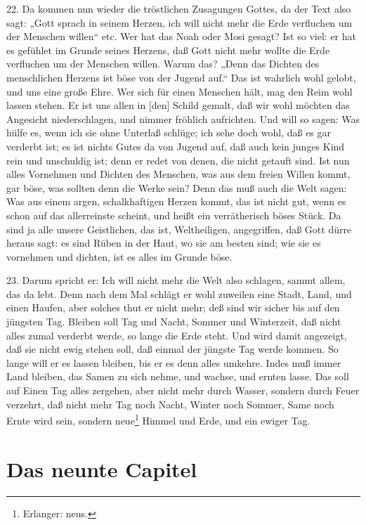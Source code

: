 22. Da kommen nun wieder die tröstlichen Zusagungen Gottes, da der Text also sagt: „Gott sprach in seinem Herzen, ich will nicht mehr die Erde verfluchen um der Menschen willen“ etc. Wer hat das Noah oder Mosi gesagt? Ist so viel: er hat es gefühlet im Grunde seines Herzens, daß Gott nicht mehr wollte die Erde verfluchen um der Menschen willen. Warum das? „Denn das Dichten des menschlichen Herzens ist böse von der Jugend auf.“ Das ist wahrlich wohl gelobt, und uns eine große Ehre. Wer sich für einen Menschen hält, mag den Reim wohl lassen stehen. Er ist uns allen in [den] Schild gemalt, daß wir wohl möchten das Angesicht niederschlagen, und nimmer fröhlich aufrichten. Und will so sagen: Was hülfe es, wenn ich sie ohne Unterlaß schlüge; ich sehe doch wohl, daß es gar verderbt ist; es ist nichts
Gutes da von Jugend auf, daß auch kein junges Kind rein und unschuldig ist; denn er redet von denen, die nicht getauft sind. Ist nun alles Vornehmen und Dichten des Menschen, was aus dem freien Willen kommt, gar böse, was sollten denn die Werke sein? Denn das muß auch die Welt sagen: Was aus einem argen, schalkhaftigen Herzen kommt, das ist nicht gut, wenn es schon auf das allerreinste scheint, und heißt ein verrätherisch böses Stück. Da sind ja alle unsere Geistlichen, das ist, Weltheiligen, angegriffen, daß Gott dürre heraus sagt: es sind Rüben in der Haut, wo sie am besten sind; wie sie es vornehmen und dichten, ist es alles im Grunde böse.

23. Darum spricht er: Ich will nicht mehr die Welt also schlagen, sammt allem, das da lebt. Denn nach dem Mal schlägt er wohl zuweilen eine Stadt, Land, und einen Haufen, aber solches thut er nicht mehr; deß sind wir sicher bis auf den jüngsten Tag. Bleiben soll Tag und Nacht, Sommer und Winterzeit, daß nicht alles zumal verderbt werde, so lange die Erde steht. Und wird damit angezeigt, daß sie nicht ewig stehen soll, daß einmal der jüngste Tag werde kommen. So lange will er es lassen bleiben, bis er es denn alles umkehre. Indes muß immer Land bleiben, das Samen zu sich nehme, und wachse, und ernten lasse. Das soll auf Einen Tag alles zergehen, aber nicht mehr durch Wasser, sondern durch Feuer verzehrt, daß nicht mehr Tag noch Nacht, Winter noch Sommer, Same noch Ernte wird sein, sondern neue\footnote{Erlanger: neus.} Himmel und Erde, und ein ewiger Tag.

\section{Das neunte Capitel}

